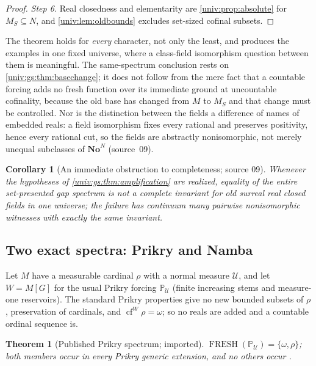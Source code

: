 \documentclass[11pt,letterpaper]{article}
\numberwithin{equation}{section}
\newtheorem{theorem}{Theorem}[section]
\newtheorem{corollary}[corollary]{Corollary}
\theoremstyle{definition}
\theoremstyle{remark}
\newcommand{\No}{\mathbf{No}}
\newcommand{\NoN}{\No^{N}}
\newcommand{\cf}{\operatorname{cf}}
\newcommand{\FRESH}{\operatorname{FRESH}}
\begin{document}
\begin{proof}
\emph{Step 6.} Real closedness and elementarity are \cref{univ:prop:absolute} for
$M_S\subseteq N$, and \cref{univ:lem:oldbounds} excludes set-sized cofinal subsets.
\end{proof}

The theorem holds for \emph{every} character, not only the least, and produces the examples in
one fixed universe, where a class-field isomorphism question between them is meaningful. The
same-spectrum conclusion rests on \cref{univ:gs:thm:basechange}; it does not follow from the
mere fact that a countable forcing adds no fresh function over its immediate ground at
uncountable cofinality, because the old base has changed from $M$ to $M_S$ and that change must
be controlled. Nor is the distinction between the fields a difference of names of embedded
reals: a field isomorphism fixes every rational and preserves positivity, hence every rational
cut, so the fields are abstractly nonisomorphic, not merely unequal subclasses of $\NoN$
(source~09).

\begin{corollary}[An immediate obstruction to completeness; source 09]\label{univ:gs:cor:noncomplete}
Whenever the hypotheses of \cref{univ:gs:thm:amplification} are realized, equality of the entire
set-presented gap spectrum is not a complete invariant for old surreal real closed fields in one
universe; the failure has continuum many pairwise nonisomorphic witnesses with exactly the same
invariant.
\end{corollary}

\subsection{Two exact spectra: Prikry and Namba}

Let $M$ have a measurable cardinal $\rho$ with a normal measure $\mathcal U$, and let $W=M[G]$
for the usual Prikry forcing $\mathbb P_{\mathcal U}$ (finite increasing stems and measure-one
reservoirs). The standard Prikry properties give no new bounded subsets of $\rho$, preservation
of cardinals, and $\cf^W\rho=\omega$; so no reals are added and a countable ordinal sequence is.

\begin{theorem}[Published Prikry spectrum; imported]\label{univ:gs:thm:prikryinput}
$\FRESH(\mathbb P_{\mathcal U})=\{\omega,\rho\}$; both members occur in every Prikry generic
extension, and no others occur \cite[Theorem~7.21(1)]{FKW}.
\end{theorem}
\end{document}
